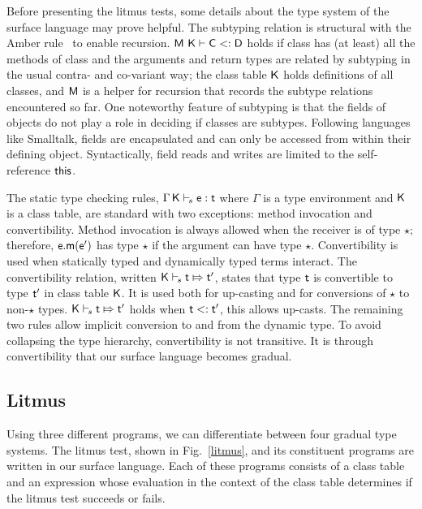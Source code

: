 \documentclass[a4paper,UKenglish]{lipics-v2018}
\newcommand{\EM}[1]{\ensuremath{#1}\xspace}
\newcommand{\xt}[1]{{\sf{#1}}}
\newcommand{\EMxt}[1]{\EM{\xt{#1}}}
\newcommand{\m}{\EMxt m}
\newcommand{\K}{\EMxt K}
\newcommand{\M}{\EMxt{M}}
\newcommand{\Env}{\EM{\Gamma}}
\newcommand{\any}{\EM{\star}}
\newcommand{\this}{\EMxt{this}}
\newcommand{\Sub}{\EM{<:}}
\newcommand{\ConvertE}[4]{\EM{#1 \vdash_{\!s} #3 \Mapsto #4}}
\newcommand{\StrSub}[4]{\EM{#1~#2\vdash #3\Sub #4}}
\newcommand{\EnvTypeS}[4]{ \EM{#1\,#2\vdash_{\!s} #3 : #4}}
\newcommand{\figref}[1]{Fig.~\ref{#1}\xspace}
\newcounter{rules}
\begin{document}
\enlargethispage{-1\baselineskip}
Before presenting the litmus tests, some details about the type system of the
surface language may prove helpful. The subtyping relation is structural
with the Amber rule~\cite{cardelli1985amber} to enable recursion. \StrSub\M\K\C\D holds if class
\C has (at least) all the methods of class \D and the arguments and return
types are related by subtyping in the usual contra- and co-variant way; the
class table \K holds definitions of all classes, and \M is a helper for
recursion that records the subtype relations encountered so far. One noteworthy feature of subtyping is that the fields of objects
do not play a role in deciding if classes are subtypes. Following languages
like Smalltalk, fields are encapsulated and can only be accessed from within their
defining object. Syntactically, field reads and writes are limited to
the self-reference \this. 

The static type checking rules, \EnvTypeS \Env\K\e\t where \Env is 
a type environment and \K is a class table,
are standard with two exceptions: method invocation and convertibility. 
Method invocation is always allowed when the receiver \e is of 
type \any; therefore, \EM{\e.\m(\ep)} has type \any if the argument
can have type \any. Convertibility 
is used when statically typed and dynamically typed terms
interact. The convertibility relation, written $\ConvertE\K s\t\tp$, states
that type $\t$ is convertible to type $\tp$ in class table \K. It
is used both for up-casting and for conversions of \any to non-\any types.
$\ConvertE\K s\t\tp$ holds when $\t\Sub\tp$, this allows up-casts. The
remaining two rules allow implicit conversion to and from the dynamic type.
To avoid collapsing the type hierarchy, convertibility is not transitive.
It is through convertibility that our surface language becomes gradual.

\subsection{Litmus}

Using three different programs, we can differentiate between four gradual
type systems. The litmus test, shown in \figref{litmus}, and its
constituent programs are written in our surface language. Each of these
programs consists of a class table and an expression whose evaluation in
the context of the class table determines if the litmus test succeeds or
fails.
\end{document}
